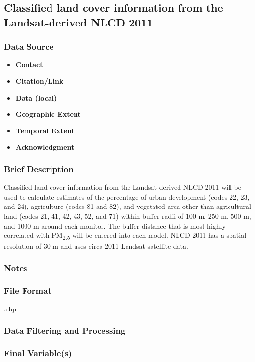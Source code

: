 \subsection{Classified land cover information from the Landsat-derived NLCD 2011}
\subsubsection*{Data Source}
\begin{itemize}[nolistsep]
\item \textbf{Contact}
\item \textbf{Citation/Link}
\item \textbf{Data (local)}
\item \textbf{Geographic Extent}
\item \textbf{Temporal Extent}
\item \textbf{Acknowledgment}
\end{itemize}
\subsubsection*{Brief Description}

Classified land cover information from the Landsat-derived NLCD 2011 
\citep{Homer2017} will be used to calculate estimates of the percentage of urban development (codes 22, 23, and 24), agriculture (codes 81 and 82), and vegetated area other than agricultural land (codes 21, 41, 42, 43, 52, and 71) within buffer radii of 100 m, 250 m, 500 m, and 1000 m around each monitor. The buffer distance that is most highly correlated with PM\textsubscript{2.5} will be entered into each model. NLCD 2011 has a spatial resolution of 30 m and uses circa 2011 Landsat satellite data. 

\subsubsection*{Notes}
\subsubsection*{File Format} .shp
\subsubsection*{Data Filtering and Processing}
\subsubsection*{Final Variable(s)}
